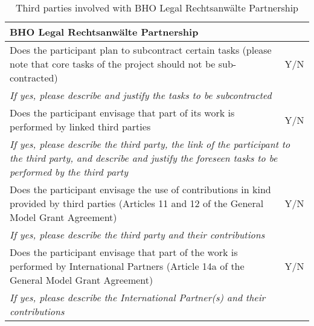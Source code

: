 \begin{table}[H]
	\centering
	\begin{tabular}{|p{10cm}|p{4cm}|}
		\hline
		
		\multicolumn{2}{|p{14cm}|}{\textbf{BHO Legal Rechtsanwälte Partnership}}\\
		
		\hline
		
		Does the participant plan to subcontract certain tasks (please note that core tasks of the project should not be sub-contracted) & Y/N\\
		
		\hline
		
		\multicolumn{2}{|p{14cm}|}{\textit{If yes, please describe and justify the tasks to be subcontracted}}\\
		
		\hline
		
		Does the participant envisage that part of its work is performed by linked third parties & Y/N\\
		
		\hline
		
		\multicolumn{2}{|p{14cm}|}{\textit{If yes, please describe the third party, the link of the participant to the third party, and describe and justify the foreseen tasks to be performed by the third party}}\\
		
		\hline
		
		Does the participant envisage the use of contributions in kind provided by third parties (Articles 11 and 12 of the General Model Grant Agreement) & Y/N\\
		
		\hline
		
		\multicolumn{2}{|p{14cm}|}{\textit{If yes, please describe the third party and their contributions}}\\
		
		\hline
		
		Does the participant envisage that part of the work is performed by International Partners (Article 14a of the General Model Grant Agreement) & Y/N\\
		
		\hline
		
		\multicolumn{2}{|p{14cm}|}{\textit{If yes, please describe the International Partner(s) and their contributions}}\\
		
		\hline
	\end{tabular}
	\caption{Third parties involved with BHO Legal Rechtsanwälte Partnership}
\end{table}



